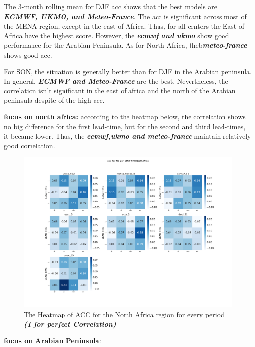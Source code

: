 The 3-month rolling mean for DJF acc shows that the best models are \textbf{\textit{ECMWF, UKMO, and Meteo-France}}. The acc is significant across most of the MENA region, except in the east of Africa. Thus, for all centers the East of Africa have the highest score. However, the \textbf{\textit{ecmwf and ukmo}} show good performance for 
the Arabian Peninsula. As for North Africa, theb\textbf{\textit{meteo-france}} shows good acc.

 
For SON, the situation is generally better than for DJF in the Arabian peninsula. In general, \textbf{\textit{ECMWF and Meteo-France}} are the best. Nevertheless, the correlation isn't significant in the east of africa and the north of the Arabian peninsula despite of the high acc.

\vspace{1.5cm}

\textbf{focus on north africa:}
according to the heatmap below, the correlation shows no big difference for the first lead-time, but for the second and third lead-times, it became lower. Thus, the \textbf{\textit{ecmwf,ukmo and meteo-france}} maintain relatively good correlation.


\begin{figure}[H]
	\centering
	\includegraphics[scale=0.25]{plots/det/acc/acc_RR_NorthAfrica.png}
	\caption{The Heatmap of ACC for the North Africa region for every period \textbf{\textit{(1 for perfect Correlation)} }}
\end{figure}

\vspace{1.5cm}
\textbf{focus on Arabian Peninsula}:

